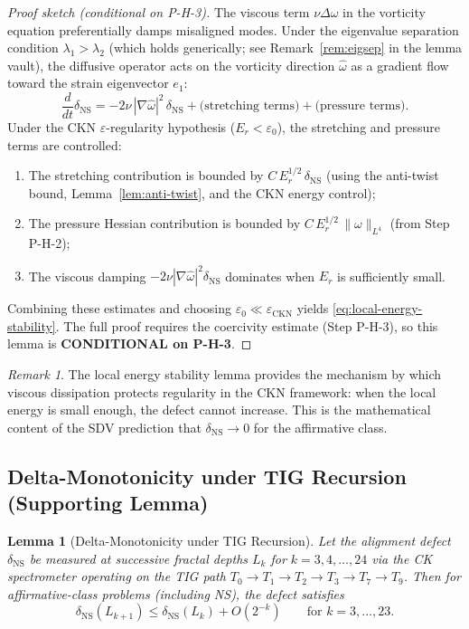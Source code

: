 \documentclass[11pt]{article}
\newtheorem{lemma}[theorem]{Lemma}
\theoremstyle{definition}
\theoremstyle{remark}
\newtheorem{remark}[theorem]{Remark}
\newcommand{\eps}{\varepsilon}
\begin{document}
\begin{proof}[Proof sketch (conditional on P-H-3)]
The viscous term $\nu\Delta\omega$ in the vorticity equation preferentially
damps misaligned modes.  Under the eigenvalue separation condition
$\lambda_1 > \lambda_2$ (which holds generically; see Remark~\ref{rem:eigsep}
in the lemma vault), the diffusive operator acts on the vorticity direction
$\hat\omega$ as a gradient flow toward the strain eigenvector $e_1$:
\[
  \frac{d}{dt}\delta_{\mathrm{NS}} = -2\nu\,|\nabla\hat\omega|^2\,
  \delta_{\mathrm{NS}} + \text{(stretching terms)} + \text{(pressure terms)}.
\]
Under the CKN $\eps$-regularity hypothesis ($E_r < \eps_0$), the stretching
and pressure terms are controlled:
\begin{enumerate}[nosep]
  \item The stretching contribution is bounded by $C\,E_r^{1/2}\,\delta_{\mathrm{NS}}$
    (using the anti-twist bound, Lemma~\ref{lem:anti-twist}, and the CKN energy control);
  \item The pressure Hessian contribution is bounded by
    $C\,E_r^{1/2}\,\|\omega\|_{L^4}$ (from Step P-H-2);
  \item The viscous damping $-2\nu|\nabla\hat\omega|^2\delta_{\mathrm{NS}}$
    dominates when $E_r$ is sufficiently small.
\end{enumerate}
Combining these estimates and choosing $\eps_0 \ll \eps_{\mathrm{CKN}}$
yields \eqref{eq:local-energy-stability}.  The full proof requires
the coercivity estimate (Step P-H-3), so this lemma is
\textbf{CONDITIONAL on P-H-3}.
\end{proof}

\begin{remark}
The local energy stability lemma provides the mechanism by which viscous
dissipation protects regularity in the CKN framework: when the local energy
is small enough, the defect cannot increase.  This is the mathematical content
of the SDV prediction that $\delta_{\mathrm{NS}} \to 0$ for the affirmative class.
\end{remark}

\subsection{Delta-Monotonicity under TIG Recursion (Supporting Lemma)}

\begin{lemma}[Delta-Monotonicity under TIG Recursion]
\label{lem:delta-monotonicity-tig}
Let the alignment defect $\delta_{\mathrm{NS}}$ be measured at successive
fractal depths $L_k$ for $k = 3, 4, \ldots, 24$ via the CK spectrometer
operating on the TIG path $T_0 \to T_1 \to T_2 \to T_3 \to T_7 \to T_9$.
Then for affirmative-class problems (including NS), the defect satisfies
\begin{equation}\label{eq:delta-monotonicity}
  \delta_{\mathrm{NS}}(L_{k+1}) \leq \delta_{\mathrm{NS}}(L_k) + O(2^{-k})
  \qquad \text{for } k = 3, \ldots, 23.
\end{equation}
\end{lemma}
\end{document}
